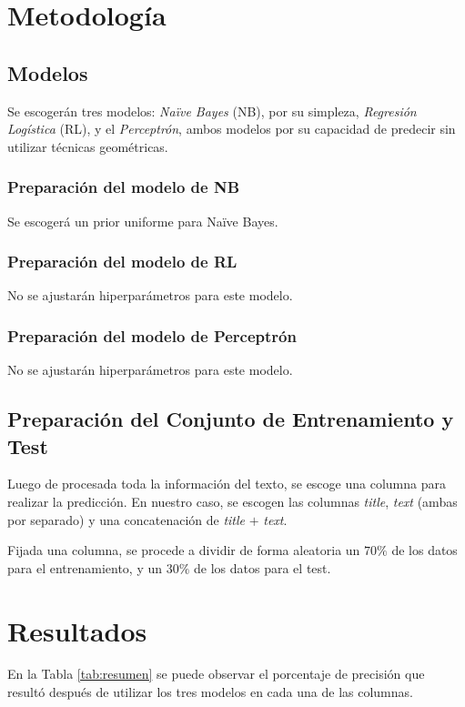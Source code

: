 \section{Metodología}
{
\subsection{Modelos}
Se escogerán tres modelos: \textit{Naïve Bayes} (NB), por su simpleza, \textit{Regresión Logística} (RL), y el \textit{Perceptrón}, ambos modelos por su capacidad de predecir sin utilizar técnicas geométricas.

\subsubsection{Preparación del modelo de NB} 
Se escogerá un prior uniforme para Naïve Bayes.

\subsubsection{Preparación del modelo de RL}
No se ajustarán hiperparámetros para este modelo.

\subsubsection{Preparación del modelo de Perceptrón}
No se ajustarán hiperparámetros para este modelo.

\subsection{Preparación del Conjunto de Entrenamiento y Test}
Luego de procesada toda la información del texto, se escoge una columna para realizar la predicción. En nuestro caso, se escogen las columnas \textit{title}, \textit{text} (ambas por separado) y una concatenación de \textit{title} $+$ \textit{text}. 

Fijada una columna, se procede a dividir de forma aleatoria un $70\%$ de los datos para el entrenamiento, y un $30\%$ de los datos para el test.

}

\section{Resultados}
{
En la Tabla \ref{tab:resumen} se puede observar el porcentaje de precisión que resultó después de utilizar los tres modelos en cada una de las columnas.


}

